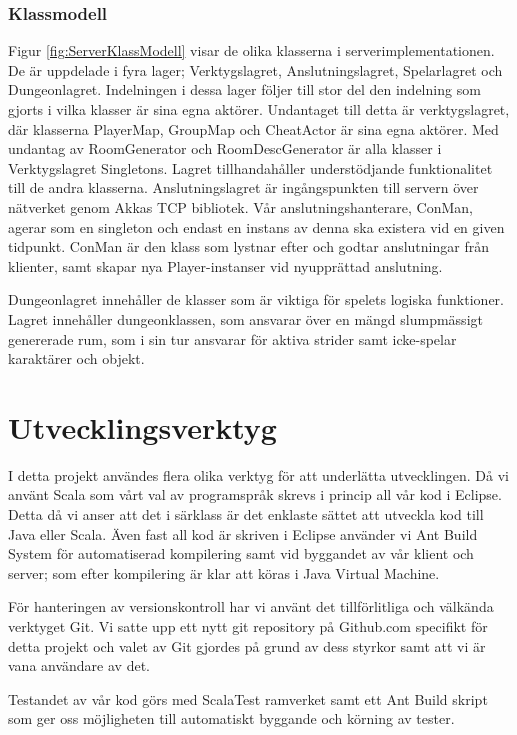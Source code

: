 \documentclass[a4paper]{article}
\begin{document}
\subsubsection{Klassmodell}
Figur \ref{fig:ServerKlassModell} visar de olika klasserna i serverimplementationen.
De är uppdelade i fyra lager; Verktygslagret, Anslutningslagret, Spelarlagret och Dungeonlagret. Indelningen i dessa lager följer till stor del
den indelning som gjorts i vilka klasser är sina egna aktörer. Undantaget till detta är verktygslagret, där klasserna PlayerMap, GroupMap och CheatActor är sina egna aktörer.
Med undantag av RoomGenerator och RoomDescGenerator är alla klasser i Verktygslagret Singletons. Lagret tillhandahåller  understödjande funktionalitet till de andra klasserna.
Anslutningslagret är ingångspunkten till servern över nätverket genom Akkas TCP bibliotek. Vår anslutningshanterare, ConMan, agerar som en singleton och endast en 
instans av denna ska existera vid en given tidpunkt. ConMan är den klass som lystnar efter och godtar anslutningar från klienter, samt skapar nya Player-instanser vid nyupprättad anslutning.

Dungeonlagret innehåller de klasser som är viktiga för spelets logiska funktioner. Lagret innehåller dungeonklassen, som ansvarar över en mängd slumpmässigt genererade rum, som i sin tur
ansvarar för aktiva strider samt icke-spelar karaktärer och objekt.

\section{Utvecklingsverktyg}

I detta projekt användes flera olika verktyg för att underlätta utvecklingen. Då vi använt Scala som vårt val av programspråk skrevs i princip all vår kod i Eclipse. 
Detta då vi anser att det i särklass är det enklaste sättet att utveckla kod till Java eller Scala. Även fast all kod är skriven i Eclipse använder vi Ant Build System 
för automatiserad kompilering samt vid byggandet av vår klient och server; som efter kompilering är klar att köras i Java Virtual Machine. 

För hanteringen av versionskontroll har vi använt det tillförlitliga och välkända verktyget Git. Vi satte upp ett nytt git repository på Github.com specifikt för detta 
projekt och valet av Git gjordes på grund av dess styrkor samt att vi är vana användare av det.

Testandet av vår kod görs med ScalaTest ramverket samt ett Ant Build skript som ger oss möjligheten till automatiskt byggande och körning av tester.
\end{document}
